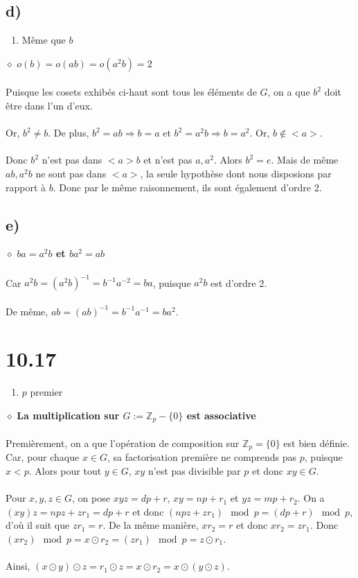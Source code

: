 \documentclass[a4paper,10pt]{article}
\begin{document}
\subsection*{d)}
\begin{enumerate}
 \item Même que $b$
\end{enumerate}
$\diamond$ \textbf{$o(b) = o(ab) = o(a^2 b) = 2$}
\\
\\
Puisque les cosets exhibés ci-haut sont tous les éléments de $G$, on a que $b^2$ doit être dans l'un d'eux.
\\
\\
Or, $b^2 \not = b$. De plus, $b^2 = ab \Rightarrow b = a$ et $b^2 = a^2 b \Rightarrow b = a^2$. Or, $b \not \in <a>$.
\\
\\
Donc $b^2$ n'est pas dans $<a>b$ et n'est pas $a,a^2$. Alors $b^2 = e$. Mais de même $ab, a^2b$ ne sont pas dans $<a>$, la 
seule hypothèse dont nous disposions par rapport à $b$. Donc par le même raisonnement, ils sont également d'ordre 2.

\subsection*{e)}
$\diamond$ \textbf{$ba = a^2 b$ et $ba^2 = ab$}
\\
\\
Car $a^2 b = (a^2 b)^{-1} = b^{-1}a^{-2} = ba$, puisque $a^2 b$ est d'ordre 2. 
\\
\\
De même, $ab = (ab)^{-1} = b^{-1}a^{-1} = ba^2$.

\section*{10.17}
\begin{enumerate}
 \item $p$ premier
\end{enumerate}
$\diamond$ \textbf{La multiplication sur $G := \mathbb{Z}_p - \{0\}$ est associative}
\\
\\
Premièrement, on a que l'opération de composition sur $\mathbb{Z}_p = \{0\}$ est bien définie. Car, pour chaque $x \in G$, sa factorisation
première ne comprends pas $p$, puisque $x < p$. Alors pour tout $y \in G$, $xy$ n'est pas divisible par $p$ et donc $xy \in G$.
\\
\\
Pour $x,y,z \in G$, on pose $xyz = dp + r$, $xy = np + r_1$ et $yz = mp + r_2$. On a $(xy)z = npz + z r_1 = dp + r$ et donc
$(npz + z r_1) \mod{p} = (dp + r) \mod{p}$, d'où il suit que $z r_1 = r$. De la même manière, $x r_2 = r$ et donc $x r_2 = z r_1$. Donc
$(x r_2) \mod{p} = x \odot r_2 = (z r_1) \mod{p} = z \odot r_1$. 
\\
\\
Ainsi, $(x \odot y) \odot z = r_1 \odot z = x \odot r_2 = x \odot (y \odot z)$.
\end{document}
